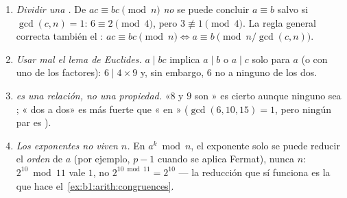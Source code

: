\begin{remark}\label{rem:b1:arith:pitfalls}
\begin{enumerate}
  \item \emph{Dividir una .} De $ac \equiv bc \pmod n$
        \emph{no} se puede concluir $a \equiv b$ salvo si
        $\gcd(c, n) = 1$: $6 \equiv 2 \pmod 4$, pero
        $3 \not\equiv 1 \pmod 4$. La regla general correcta
         también el : $ac \equiv bc \pmod n \iff a
        \equiv b \pmod{n/\gcd(c,n)}$.
  \item \emph{Usar mal el lema de Euclides.} $a \mid bc$ implica
        $a \mid b$ o $a \mid c$ solo para $a$ \emph{} (o
         con uno de los factores): $6 \mid 4 \times 9$ y, sin
        embargo, $6$ no  a ninguno de los dos.
  \item \emph{ es una relación, no una propiedad.} «$8$ y
        $9$ son » es cierto aunque ninguno sea ; «
        dos a dos» es más fuerte que « en »
        ($\gcd(6, 10, 15) = 1$, pero ningún par es ).
  \item \emph{Los exponentes no viven  $n$.} En $a^k \bmod n$,
        el exponente solo se puede reducir  el \emph{orden} de
        $a$ (por ejemplo, $p - 1$ cuando se aplica Fermat), nunca
         $n$: $2^{10} \bmod 11$ vale $1$, no
        $2^{10 \bmod 11} = 2^{10}$ --- la reducción que sí funciona es
        la que hace el~\cref{ex:b1:arith:congruences}.
\end{enumerate}
\end{remark}

